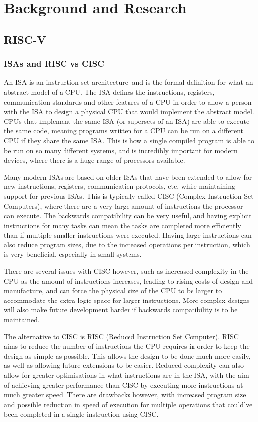 \chapter{Background and Research}
\label{ch:background}

\section{RISC-V}
\label{sec:riscv-background}
\subsection{ISAs and RISC vs CISC}
An ISA is an instruction set architecture, and is the formal definition for what an abstract model of a CPU. The ISA defines the instructions, registers, communication standards and other features of a CPU in order to allow a person with the ISA to design a physical CPU that would implement the abstract model. CPUs that implement the same ISA (or supersets of an ISA) are able to execute the same code, meaning programs written for a CPU can be run on a different CPU if they share the same ISA. This is how a single compiled program is able to be run on so many different systems, and is incredibly important for modern devices, where there is a huge range of processors available. 

Many modern ISAs are based on older ISAs that have been extended to allow for new instructions, registers, communication protocols, etc, while maintaining support for previous ISAs. This is typically called CISC (Complex Instruction Set Computers), where there are a very large amount of instructions the processor can execute. The backwards compatibility can be very useful, and having explicit instructions for many tasks can mean the tasks are completed more efficiently than if multiple smaller instructions were executed. Having large instructions can also reduce program sizes, due to the increased operations per instruction, which is very beneficial, especially in small systems.

There are several issues with CISC however, such as increased complexity in the CPU as the amount of instructions increases, leading to rising costs of design and manufacture, and can force the physical size of the CPU to be larger to accommodate the extra logic space for larger instructions. More complex designs will also make future development harder if backwards compatibility is to be maintained. 

The alternative to CISC is RISC (Reduced Instruction Set Computer). RISC aims to reduce the number of instructions the CPU requires in order to keep the design as simple as possible. This allows the design to be done much more easily, as well as allowing future extensions to be easier. Reduced complexity can also allow for greater optimisations in what instructions are in the ISA, with the aim of achieving greater performance than CISC by executing more instructions at much greater speed. There are drawbacks however, with increased program size and possible reduction in speed of execution for multiple operations that could've been completed in a single instruction using CISC.

